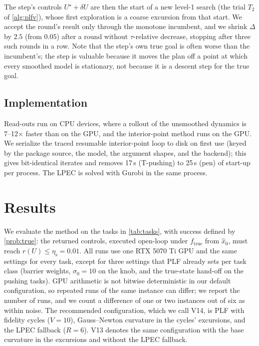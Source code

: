 \documentclass[11pt]{article}
\theoremstyle{remark}
\newcommand{\ftrue}{f_{\mathrm{true}}}
\newcommand{\etas}{\eta_{\mathrm{s}}}
\newcommand{\inc}{U^\star}
\begin{document}
The step's controls $\inc + \delta U$ are then the start of a new level-1 search (the trial $T_2$ of \cref{alg:plfv}), whose first exploration is a coarse excursion from that start. We accept the round's result only through the monotone incumbent, and we shrink $\Delta$ by $2.5$ (from $0.05$) after a round without $\tau$-relative decrease, stopping after three such rounds in a row. Note that the step's own true goal is often worse than the incumbent's; the step is valuable because it moves the plan off a point at which every smoothed model is stationary, not because it is a descent step for the true goal.

\subsection{Implementation}
\label{sec:impl}

Read-outs run on CPU devices, where a rollout of the unsmoothed dynamics is 7--12$\times$ faster than on the GPU, and the interior-point method runs on the GPU. We serialize the traced resumable interior-point loop to disk on first use (keyed by the package source, the model, the argument shapes, and the backend); this gives bit-identical iterates and removes 17\,s (T-pushing) to 25\,s (pen) of start-up per process. The LPEC is solved with Gurobi in the same process.

\section{Results}
\label{sec:results}

We evaluate the method on the tasks in \cref{tab:tasks}, with success defined by \cref{prob:true}: the returned controls, executed open-loop under $\ftrue$ from $\hat x_0$, must reach $r(U) \leq \etas = 0.01$. All runs use one RTX 5070 Ti GPU and the same settings for every task, except for three settings that PLF already sets per task class (barrier weights, $\sigma_0 = 10$ on the knob, and the true-state hand-off on the pushing tasks). GPU arithmetic is not bitwise deterministic in our default configuration, so repeated runs of the same instance can differ; we report the number of runs, and we count a difference of one or two instances out of six as within noise. The recommended configuration, which we call V14, is PLF with fidelity cycles ($V = 10$), Gauss--Newton curvature in the cycles' excursions, and the LPEC fallback ($R = 6$). V13 denotes the same configuration with the base curvature in the excursions and without the LPEC fallback.
\end{document}

